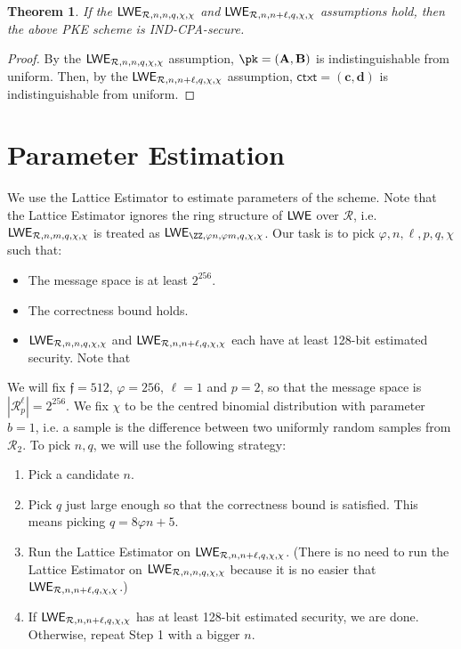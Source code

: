 \documentclass[a4paper,10pt]{article}
\renewcommand{\vec}[1]{\ensuremath{\mathbf{#1}}\xspace}
\newcommand{\mat}[1]{\ensuremath{\mathbf{#1}}\xspace}
\newcommand{\ring}{\mathcal{R}}
\newcommand{\LWE}[1]%
{\ifthenelse{\equal{#1}{}}%
  {\ensuremath{\mathsf{LWE}}}%
  {\ensuremath{\mathsf{LWE}_{\/#1}}}%
  \xspace%
}
\newcommand{\ctxt}{\mathsf{ctxt}}
\newcommand{\conductor}{\mathfrak{f}}
\newtheorem{theorem}[definition]{Theorem}
\begin{document}
\begin{theorem}
  If the $\LWE{\ring,n,n,q,\chi,\chi}$ and $\LWE{\ring,n,n+\ell,q,\chi,\chi}$ assumptions hold, then the above PKE scheme is IND-CPA-secure.
\end{theorem}

\begin{proof}
  By the $\LWE{\ring,n,n,q,\chi,\chi}$ assumption, $\pk = (\mat{A}, \mat{B})$ is indistinguishable from uniform.
  Then, by the $\LWE{\ring,n,n+\ell,q,\chi,\chi}$ assumption, $\ctxt = (\vec{c}, \vec{d})$ is indistinguishable from uniform.
\end{proof}

\section{Parameter Estimation}

We use the Lattice Estimator to estimate parameters of the scheme. 
Note that the Lattice Estimator ignores the ring structure of $\LWE{}$ over $\ring$, i.e. $\LWE{\ring,n,m,q,\chi,\chi}$ is treated as $\LWE{\ZZ,\varphi n,\varphi m,q,\chi,\chi}$.
Our task is to pick $\varphi, n, \ell, p, q, \chi$ such that: 
\begin{itemize}
  \item The message space is at least $2^{256}$.
  \item The correctness bound holds. 
  \item $\LWE{\ring,n,n,q,\chi,\chi}$ and $\LWE{\ring,n,n+\ell,q,\chi,\chi}$ each have at least 128-bit estimated security.  Note that 
\end{itemize}

We will fix $\conductor = 512$, $\varphi = 256$, $\ell = 1$ and $p = 2$, so that the message space is $|\ring_p^\ell| = 2^{256}$.
We fix $\chi$ to be the centred binomial distribution with parameter $b = 1$, i.e. a sample is the difference between two uniformly random samples from $\ring_2$.
To pick $n, q$, we will use the following strategy: 
\begin{enumerate}
  \item Pick a candidate $n$.
  \item Pick $q$ just large enough so that the correctness bound is satisfied. This means picking $q = 8 \varphi n + 5$. 
  \item Run the Lattice Estimator on $\LWE{\ring,n,n+\ell,q,\chi,\chi}$. (There is no need to run the Lattice Estimator on $\LWE{\ring,n,n,q,\chi,\chi}$ because it is no easier that $\LWE{\ring,n,n+\ell,q,\chi,\chi}$.)
  \item If $\LWE{\ring,n,n+\ell,q,\chi,\chi}$ has at least 128-bit estimated security, we are done. Otherwise, repeat Step 1 with a bigger $n$.
\end{enumerate}
\end{document}
